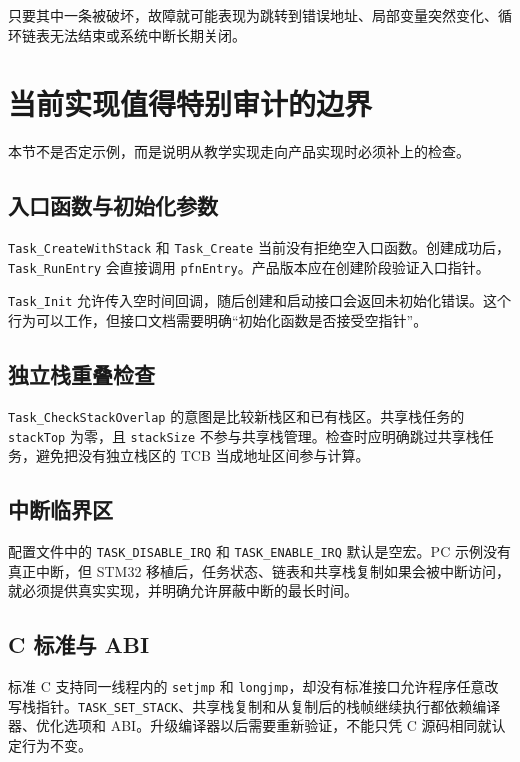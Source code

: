 只要其中一条被破坏，故障就可能表现为跳转到错误地址、局部变量突然变化、循环链表无法结束或系统中断长期关闭。

\section{当前实现值得特别审计的边界}

本节不是否定示例，而是说明从教学实现走向产品实现时必须补上的检查。

\subsection{入口函数与初始化参数}

\texttt{Task\_CreateWithStack} 和 \texttt{Task\_Create} 当前没有拒绝空入口函数。创建成功后，\texttt{Task\_RunEntry} 会直接调用 \texttt{pfnEntry}。产品版本应在创建阶段验证入口指针。

\texttt{Task\_Init} 允许传入空时间回调，随后创建和启动接口会返回未初始化错误。这个行为可以工作，但接口文档需要明确“初始化函数是否接受空指针”。

\subsection{独立栈重叠检查}

\texttt{Task\_CheckStackOverlap} 的意图是比较新栈区和已有栈区。共享栈任务的 \texttt{stackTop} 为零，且 \texttt{stackSize} 不参与共享栈管理。检查时应明确跳过共享栈任务，避免把没有独立栈区的 TCB 当成地址区间参与计算。

\subsection{中断临界区}

配置文件中的 \texttt{TASK\_DISABLE\_IRQ} 和 \texttt{TASK\_ENABLE\_IRQ} 默认是空宏。PC 示例没有真正中断，但 STM32 移植后，任务状态、链表和共享栈复制如果会被中断访问，就必须提供真实实现，并明确允许屏蔽中断的最长时间。

\subsection{C 标准与 ABI}

标准 C 支持同一线程内的 \texttt{setjmp} 和 \texttt{longjmp}，却没有标准接口允许程序任意改写栈指针。\texttt{TASK\_SET\_STACK}、共享栈复制和从复制后的栈帧继续执行都依赖编译器、优化选项和 ABI。升级编译器以后需要重新验证，不能只凭 C 源码相同就认定行为不变。

